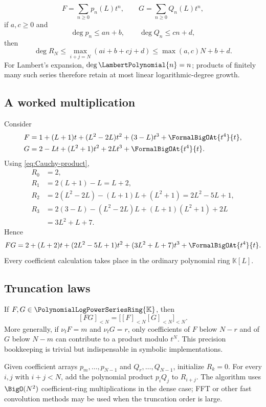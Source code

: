 \documentclass[11pt]{article}
\theoremstyle{pltheorem}
\newcommand{\K}{\mathbb K}
\newcommand{\PL}{\PolynomialLogPowerSeriesRing{\K}}
\newcommand{\ordt}{\nu_t}
\begin{document}
\[
 F=\sum_{n\ge0}p_n(L)t^n,
 \qquad
 G=\sum_{n\ge0}Q_n(L)t^n,
\]
if \(a,c\ge0\) and
\[
 \deg p_n\le an+b,
 \qquad
 \deg Q_n\le cn+d,
\]
then
\begin{equation}\label{eq:linear-degree-profile}
 \deg R_N\le \max_{i+j=N}(ai+b+cj+d)
 \le \max(a,c)N+b+d.
\end{equation}
For Lambert's expansion, \(\deg \LambertPolynomial{n}=n\); products of finitely many such series therefore retain at most linear logarithmic-degree growth.

\subsection{A worked multiplication}

Consider
\begin{align*}
 F&=1+(L+1)t+(L^2-2L)t^2+(3-L)t^3+\FormalBigOAt{t^4}{t},\\
 G&=2-Lt+(L^2+1)t^2+2Lt^3+\FormalBigOAt{t^4}{t}.
\end{align*}
Using \cref{eq:Cauchy-product},
\begin{align*}
 R_0&=2,\\
 R_1&=2(L+1)-L=L+2,\\
 R_2&=2(L^2-2L)-(L+1)L+(L^2+1)
      =2L^2-5L+1,\\
 R_3&=2(3-L)-(L^2-2L)L+(L+1)(L^2+1)+2L\\
    &=3L^2+L+7.
\end{align*}
Hence
\begin{equation}\label{eq:worked-product}
 FG=2+(L+2)t+(2L^2-5L+1)t^2+(3L^2+L+7)t^3+\FormalBigOAt{t^4}{t}.
\end{equation}
Every coefficient calculation takes place in the ordinary polynomial ring \(\K[L]\).

\subsection{Truncation laws}

If \(F,G\in\PL\), then
\begin{equation}\label{eq:truncated-product-law}
 [FG]_{<N}=\bigl[[F]_{<N}[G]_{<N}\bigr]_{<N}.
\end{equation}
More generally, if \(\ordt F=m\) and \(\ordt G=r\), only coefficients of \(F\) below \(N-r\) and of \(G\) below \(N-m\) can contribute to a product modulo \(t^N\).  This precision bookkeeping is trivial but indispensable in symbolic implementations.

\begin{algorithmbox}
Given coefficient arrays \(p_m,\ldots,p_{N-1}\) and
\(Q_r,\ldots,Q_{N-1}\), initialize \(R_k=0\).  For every
\(i,j\) with \(i+j<N\), add the polynomial product \(p_iQ_j\) to
\(R_{i+j}\).  The algorithm uses \(\BigO(N^2)\) coefficient-ring
multiplications in the dense case; FFT or other fast convolution methods may be used when the truncation order is large.
\end{algorithmbox}
\end{document}
